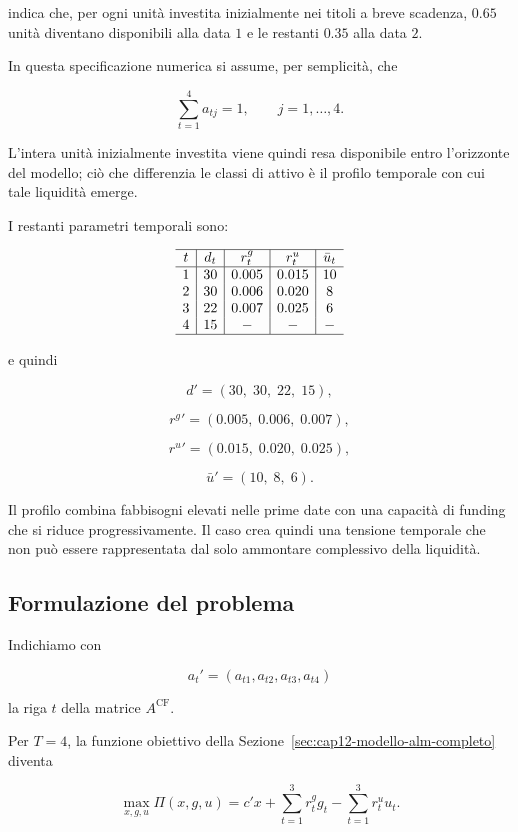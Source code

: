 \noindent indica che, per ogni unit\`a investita inizialmente nei titoli a breve
scadenza, $0.65$ unit\`a diventano disponibili alla data $1$ e le restanti
$0.35$ alla data $2$.

In questa specificazione numerica si assume, per semplicit\`a, che

\[
\sum_{t=1}^{4}a_{tj}=1,
\qquad
j=1,\ldots,4.
\]

L'intera unit\`a inizialmente investita viene quindi resa disponibile entro
l'orizzonte del modello; ci\`o che differenzia le classi di attivo \`e il
profilo temporale con cui tale liquidit\`a emerge.

I restanti parametri temporali sono:

\[
\begin{array}{c|c|c|c|c}
\hline
t & d_t & r^g_t & r^u_t & \bar u_t\\
\hline
1 & 30 & 0.005 & 0.015 & 10\\
2 & 30 & 0.006 & 0.020 & 8\\
3 & 22 & 0.007 & 0.025 & 6\\
4 & 15 & -     & -     & -\\
\hline
\end{array}
\]

\noindent e quindi

\[
d'
=
(30,\;30,\;22,\;15),
\]

\[
{r^{g}}'
=
(0.005,\;0.006,\;0.007),
\]

\[
{r^{u}}'
=
(0.015,\;0.020,\;0.025),
\]

\[
\bar u'
=
(10,\;8,\;6).
\]

Il profilo combina fabbisogni elevati nelle prime date con una capacit\`a di
funding che si riduce progressivamente. Il caso crea quindi una tensione
temporale che non pu\`o essere rappresentata dal solo ammontare complessivo
della liquidit\`a.

\subsection{Formulazione del problema}

Indichiamo con

\[
a_t'
=
(a_{t1},a_{t2},a_{t3},a_{t4})
\]

\noindent la riga $t$ della matrice $A^{\mathrm{CF}}$.

Per $T=4$, la funzione obiettivo della
Sezione~\ref{sec:cap12-modello-alm-completo} diventa

\[
\max_{x,g,u}
\Pi(x,g,u)
=
c'x
+
\sum_{t=1}^{3}r^g_tg_t
-
\sum_{t=1}^{3}r^u_tu_t.
\]

